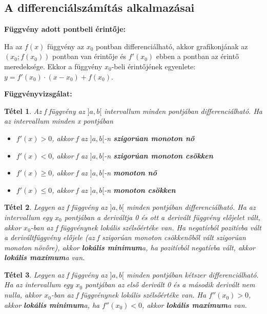 \documentclass[12pt,a4paper]{article}
\newtheorem{theorem}{Tétel} [section]
\begin{document}
\subsection{A differenciálszámítás alkalmazásai}

\textbf{Függvény adott pontbeli érintője:}

Ha az $f(x)$ függvény az $x_0$ pontban differenciálható, akkor grafikonjának az $(x_0; f(x_0))$ pontban van érintője és $f'(x_0)$ ebben a pontban az érintő meredeksége. Ekkor a függvény $x_0$-beli érintőjének egyenlete: $y = f'(x_0) \cdot (x - x_0) + f(x_0)$.

\vspace{20px}
\textbf{Függvényvizsgálat:}

\begin{theorem}
Az f függvény az $]a, b[$ intervallum minden pontjában differenciálható. Ha az intervallum minden x pontjában
\begin{itemize}
\item $f'(x)>0$, akkor f az $]a, b[$-n \textbf{szigorúan monoton nő}
\item $f'(x)<0$, akkor f az $]a, b[$-n \textbf{szigorúan monoton csökken}
\item $f'(x)\geq 0$, akkor f az $]a, b[$-n \textbf{monoton nő}
\item $f'(x)\leq 0$, akkor f az $]a, b[$-n \textbf{monoton csökken}
\end{itemize}
\end{theorem}

\begin{theorem}
Legyen az f függvény az $]a, b[$ minden pontjában differenciálható. Ha az intervallum egy $x_0$ pontjában a deriváltja 0 és ott a derivált függvény előjelet vált, akkor $x_0$-ban az f függvénynek lokális szélsőértéke van. Ha negatívból pozitívba vált a deriváltfüggvény előjele (az f szigorúan monoton csökkenőből vált szigorúan monoton növőre), akkor \textbf{lokális minimum}a, ha pozitívból negatívba vált, akkor \textbf{lokális maximum}a van.
\end{theorem}

\begin{theorem}
Legyen az f függvény az $]a, b[$ minden pontjában kétszer differenciálható. Ha az intervallum egy $x_0$ pontjában az első derivált 0 és a második derivált nem nulla, akkor $x_0$-ban az f függvénynek lokális szélsőértéke van. Ha $f''(x_0) > 0$, akkor \textbf{lokális minimum}a, ha $f''(x_0) < 0$, akkor \textbf{lokális maximum}a van.
\end{theorem}
\end{document}
